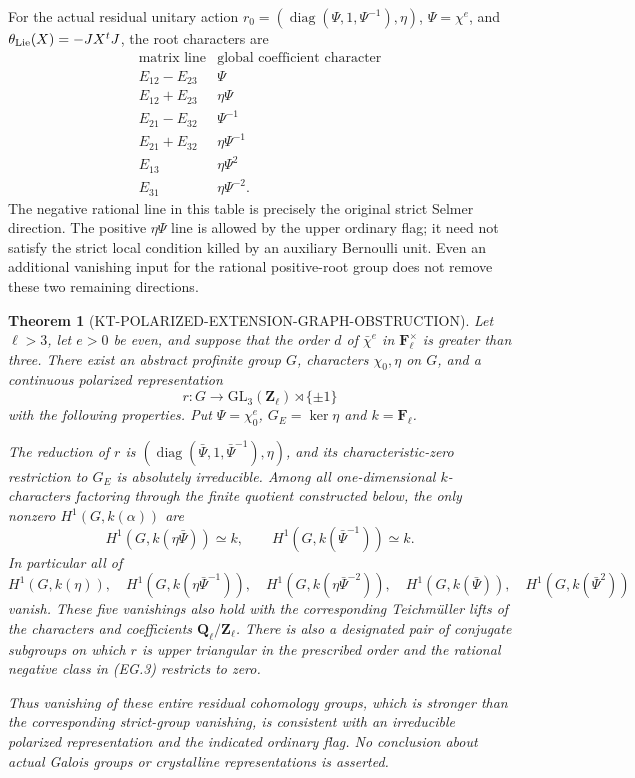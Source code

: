 \documentclass[11pt,a4paper]{article}
\newtheorem{theorem}{Theorem}[section]
\theoremstyle{definition}
\begin{document}
For the actual residual unitary action
$r_0=(\operatorname{diag}(\Psi,1,\Psi^{-1}),\eta)$,
$\Psi=\chi^e$, and
$\theta_{\rm Lie}(X)=-JX^tJ$, the root characters are
\[
\begin{array}{c|c}
\text{matrix line}&\text{global coefficient character}\\ \hline
E_{12}-E_{23}&\Psi\\
E_{12}+E_{23}&\eta\Psi\\
E_{21}-E_{32}&\Psi^{-1}\\
E_{21}+E_{32}&\eta\Psi^{-1}\\
E_{13}&\eta\Psi^2\\
E_{31}&\eta\Psi^{-2}.
\end{array}                                                \tag{EG.1}
\]
The negative rational line in this table is precisely
the original strict Selmer direction.  The positive
$\eta\Psi$ line is allowed by the upper ordinary flag;
it need not satisfy the strict local condition killed
by an auxiliary Bernoulli unit.  Even an additional
vanishing input for the rational positive-root group
does not remove these two remaining directions.

\begin{theorem}[KT-POLARIZED-EXTENSION-GRAPH-OBSTRUCTION]
Let $\ell>3$, let $e>0$ be even, and suppose that
the order $d$ of $\bar\chi^e$ in $\mathbf F_\ell^\times$
is greater than three.  There exist an abstract
profinite group $G$, characters $\chi_0,\eta$ on $G$,
and a continuous polarized representation
\[
 r:G\longrightarrow
          \mathrm{GL}_3(\mathbf Z_\ell)\rtimes\{\pm1\}
                                                               \tag{EG.2}
\]
with the following properties.  Put $\Psi=\chi_0^e$,
$G_E=\ker\eta$ and $k=\mathbf F_\ell$.

The reduction of $r$ is
$(\operatorname{diag}(\bar\Psi,1,\bar\Psi^{-1}),\eta)$,
and its characteristic-zero restriction to $G_E$ is
absolutely irreducible.  Among all one-dimensional
$k$-characters factoring through the finite quotient
constructed below, the only nonzero $H^1(G,k(\alpha))$
are
\[
 H^1(G,k(\eta\bar\Psi))\simeq k,
 \qquad H^1(G,k(\bar\Psi^{-1}))\simeq k.                  \tag{EG.3}
\]
In particular all of
\[
 H^1(G,k(\eta)),\quad
 H^1(G,k(\eta\bar\Psi^{-1})),\quad
 H^1(G,k(\eta\bar\Psi^{-2})),\quad
 H^1(G,k(\bar\Psi)),\quad
 H^1(G,k(\bar\Psi^2))                                    \tag{EG.4}
\]
vanish.  These five vanishings also hold with the corresponding
Teichm\"uller lifts of the characters and coefficients
$\mathbf Q_\ell/\mathbf Z_\ell$.
There is also a designated pair of
conjugate subgroups on which $r$ is upper triangular
in the prescribed order and the rational negative
class in (EG.3) restricts to zero.

Thus vanishing of these entire residual cohomology
groups, which is stronger than the corresponding
strict-group vanishing, is consistent with an
irreducible polarized representation and the indicated
ordinary flag.  No conclusion about actual Galois
groups or crystalline representations is asserted.
\end{theorem}
\end{document}
